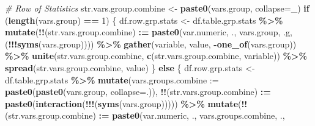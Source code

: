 \documentclass[
]{book}
\newenvironment{Shaded}{\begin{snugshade}}{\end{snugshade}}
\newcommand{\CommentTok}[1]{\textcolor[rgb]{0.56,0.35,0.01}{\textit{#1}}}
\newcommand{\ControlFlowTok}[1]{\textcolor[rgb]{0.13,0.29,0.53}{\textbf{#1}}}
\newcommand{\DataTypeTok}[1]{\textcolor[rgb]{0.13,0.29,0.53}{#1}}
\newcommand{\DecValTok}[1]{\textcolor[rgb]{0.00,0.00,0.81}{#1}}
\newcommand{\ErrorTok}[1]{\textcolor[rgb]{0.64,0.00,0.00}{\textbf{#1}}}
\newcommand{\KeywordTok}[1]{\textcolor[rgb]{0.13,0.29,0.53}{\textbf{#1}}}
\newcommand{\NormalTok}[1]{#1}
\newcommand{\OperatorTok}[1]{\textcolor[rgb]{0.81,0.36,0.00}{\textbf{#1}}}
\newcommand{\StringTok}[1]{\textcolor[rgb]{0.31,0.60,0.02}{#1}}
\begin{document}
\begin{Shaded}
\begin{Highlighting}[]
  
  \CommentTok{\# Row of Statistics}
\NormalTok{  str.vars.group.combine \textless{}{-}}\StringTok{ }\KeywordTok{paste0}\NormalTok{(vars.group, }\DataTypeTok{collapse=}\StringTok{\textquotesingle{}\_\textquotesingle{}}\NormalTok{)}
  \ControlFlowTok{if}\NormalTok{ (}\KeywordTok{length}\NormalTok{(vars.group) }\OperatorTok{==}\StringTok{ }\DecValTok{1}\NormalTok{) \{}
\NormalTok{    df.row.grp.stats \textless{}{-}}\StringTok{ }\NormalTok{df.table.grp.stats }\OperatorTok{\%\textgreater{}\%}
\StringTok{      }\KeywordTok{mutate}\NormalTok{(}\OperatorTok{!!}\NormalTok{(str.vars.group.combine) }\OperatorTok{:}\ErrorTok{=}\StringTok{ }
\StringTok{               }\KeywordTok{paste0}\NormalTok{(var.numeric, }\StringTok{\textquotesingle{}.\textquotesingle{}}\NormalTok{,}
\NormalTok{                      vars.group, }\StringTok{\textquotesingle{}.g\textquotesingle{}}\NormalTok{,}
\NormalTok{                      (}\OperatorTok{!!!}\KeywordTok{syms}\NormalTok{(vars.group)))) }\OperatorTok{\%\textgreater{}\%}
\StringTok{      }\KeywordTok{gather}\NormalTok{(variable, value, }\OperatorTok{{-}}\KeywordTok{one\_of}\NormalTok{(vars.group)) }\OperatorTok{\%\textgreater{}\%}
\StringTok{      }\KeywordTok{unite}\NormalTok{(str.vars.group.combine, }\KeywordTok{c}\NormalTok{(str.vars.group.combine, }\StringTok{\textquotesingle{}variable\textquotesingle{}}\NormalTok{)) }\OperatorTok{\%\textgreater{}\%}
\StringTok{      }\KeywordTok{spread}\NormalTok{(str.vars.group.combine, value)}
\NormalTok{  \} }\ControlFlowTok{else}\NormalTok{ \{}
\NormalTok{    df.row.grp.stats \textless{}{-}}\StringTok{ }\NormalTok{df.table.grp.stats }\OperatorTok{\%\textgreater{}\%}\StringTok{ }
\StringTok{      }\KeywordTok{mutate}\NormalTok{(}\DataTypeTok{vars.groups.combine :=} 
               \KeywordTok{paste0}\NormalTok{(}\KeywordTok{paste0}\NormalTok{(vars.group, }\DataTypeTok{collapse=}\StringTok{\textquotesingle{}.\textquotesingle{}}\NormalTok{)),}
             \OperatorTok{!!}\NormalTok{(str.vars.group.combine) }\OperatorTok{:}\ErrorTok{=}\StringTok{ }
\StringTok{               }\KeywordTok{paste0}\NormalTok{(}\KeywordTok{interaction}\NormalTok{(}\OperatorTok{!!!}\NormalTok{(}\KeywordTok{syms}\NormalTok{(vars.group))))) }\OperatorTok{\%\textgreater{}\%}
\StringTok{      }\KeywordTok{mutate}\NormalTok{(}\OperatorTok{!!}\NormalTok{(str.vars.group.combine) }\OperatorTok{:}\ErrorTok{=}\StringTok{ }
\StringTok{               }\KeywordTok{paste0}\NormalTok{(var.numeric, }\StringTok{\textquotesingle{}.\textquotesingle{}}\NormalTok{, vars.groups.combine, }\StringTok{\textquotesingle{}.\textquotesingle{}}\NormalTok{,}

\end{Highlighting}
\end{Shaded}
\end{document}
